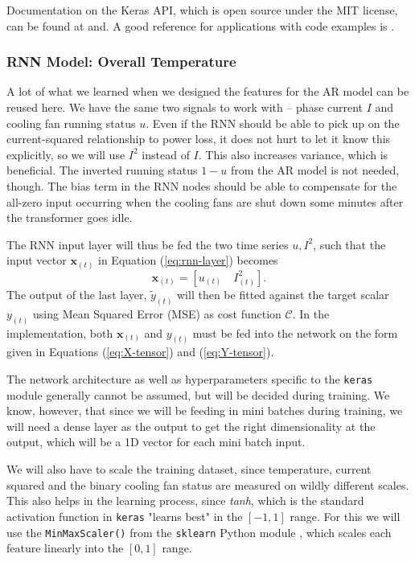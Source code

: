 \documentclass[]{article}
\begin{document}
Documentation on the Keras API, which is open source under the MIT license, can be found at \cite{keras-url} and. A good reference for applications with code examples is \cite{geron2019hands}.

\subsubsection{RNN Model: Overall Temperature} \label{sec:rnn-model-overall}
A lot of what we learned when we designed the features for the AR model can be reused here. We have the same two signals to work with -- phase current $I$ and cooling fan running status $u$. Even if the RNN should be able to pick up on the current-squared relationship to power loss, it does not hurt to let it know this explicitly, so we will use $I^2$ instead of $I$. This also increases variance, which is beneficial. The inverted running status $1 - u$ from the AR model is not needed, though. The bias term in the RNN nodes should be able to compensate for the all-zero input occurring when the cooling fans are shut down some minutes after the transformer goes idle.

The RNN input layer will thus be fed the two time series $u, I^2$, such that the input vector $\mathbf{x}_{(t)}$ in Equation (\ref{eq:rnn-layer}) becomes
\begin{equation}
	\mathbf{x}_{(t)} = [u_{(t)} \quad I^2_{(t)}].
\end{equation}
The output of the last layer, $\tilde{y}_{(t)}$ will then be fitted against the target scalar $y_{(t)}$ using Mean Squared Error (MSE) as cost function $\mathcal{C}$. In the implementation, both $\mathbf{x}_{(t)}$ and $y_{(t)}$ must be fed into the network on the form given in Equations (\ref{eq:X-tensor}) and (\ref{eq:Y-tensor}).

The network architecture as well as hyperparameters specific to the \lstinline|keras| module generally cannot be assumed, but will be decided during training. We know, however, that since we will be feeding in mini batches during training, we will need a dense layer as the output to get the right dimensionality at the output, which will be a 1D vector for each mini batch input. 

We will also have to scale the training dataset, since temperature, current squared and the binary cooling fan status are measured on wildly different scales. This also helps in the learning process, since \textit{tanh}, which is the standard activation function in \lstinline|keras| "learns best" in the $[-1,1]$ range. For this we will use the \lstinline|MinMaxScaler()| from the \lstinline|sklearn| Python module \cite{skl}, which scales each feature linearly into the $[0,1]$ range.
\end{document}
